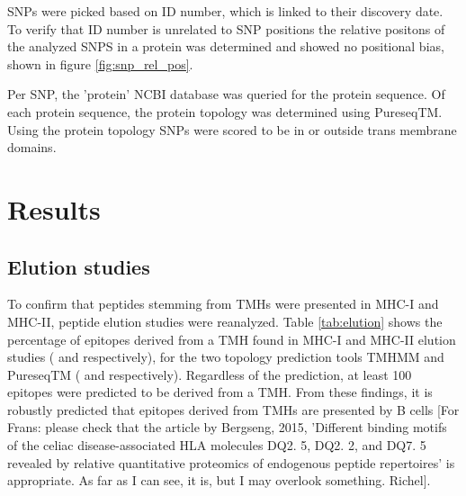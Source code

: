 %
SNPs were picked based on ID number, which is linked to their discovery date. To verify that ID number is unrelated to SNP positions the relative positons of the analyzed SNPS in a protein was determined and showed no positional bias, shown in figure \ref{fig:snp_rel_pos}.

Per SNP, the 'protein' NCBI database was queried for the
protein sequence.
Of each protein sequence, the protein topology was determined 
using PureseqTM.
Using the protein topology SNPs were scored to be in or outside trans membrane domains. 


\section{Results}

\subsection{Elution studies}



To confirm that peptides stemming from TMHs were presented in MHC-I and MHC-II,
peptide elution studies were reanalyzed.
Table \ref{tab:elution} shows the percentage of epitopes derived 
from a TMH
found in MHC-I and MHC-II elution 
studies (\cite{schellens2015comprehensive} and \cite{bergseng2015different} respectively),
for the two topology prediction tools TMHMM and 
PureseqTM (\cite{krogh2001predicting} and \cite{wang2019efficient} respectively). 
Regardless of the prediction, 
at least 100 epitopes were predicted to be derived from a TMH. 
From these findings, it is robustly predicted that
epitopes derived from TMHs are presented by B cells [For Frans: please check
that the article by Bergseng, 2015, 'Different binding motifs of the celiac 
disease-associated HLA molecules DQ2. 5, DQ2. 2, and DQ7. 5 revealed by 
relative quantitative proteomics of endogenous peptide repertoires'
is appropriate. As far as I can see, it is, but I may overlook something. Richel].


